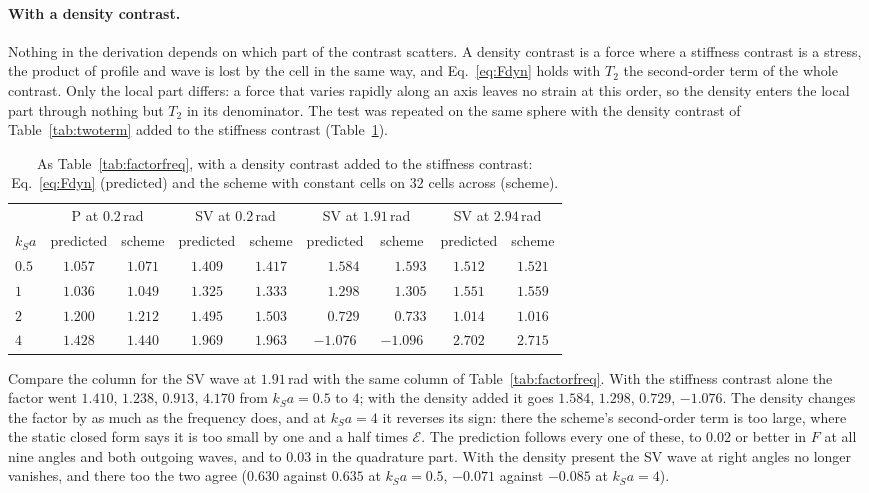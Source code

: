 \documentclass[11pt,a4paper]{article}
\newcommand{\cE}{\mathcal{E}}
\begin{document}
\paragraph{With a density contrast.} Nothing in the derivation depends on which part of the contrast
scatters. A density contrast is a force where a stiffness contrast is a stress, the product of profile
and wave is lost by the cell in the same way, and Eq.~\eqref{eq:Fdyn} holds with $T_2$ the second-order
term of the whole contrast. Only the local part differs: a force that varies rapidly along an axis leaves
no strain at this order, so the density enters the local part through nothing but $T_2$ in its
denominator. The test was repeated on the same sphere with the density contrast of
Table~\ref{tab:twoterm} added to the stiffness contrast (Table~\ref{tab:factorfreqrho}).
\begin{table}[htbp]
\centering
\caption{As Table~\ref{tab:factorfreq}, with a density contrast added to the stiffness contrast:
Eq.~\eqref{eq:Fdyn} (predicted) and the scheme with constant cells on $32$ cells across
(scheme).}\label{tab:factorfreqrho}
\small
\begin{tabular}{@{}lcccccccc@{}}
\toprule
 & \multicolumn{2}{c}{P at $0.2$\,rad} & \multicolumn{2}{c}{SV at $0.2$\,rad} &
   \multicolumn{2}{c}{SV at $1.91$\,rad} & \multicolumn{2}{c}{SV at $2.94$\,rad} \\
$k_Sa$ & predicted & scheme & predicted & scheme & predicted & scheme & predicted & scheme \\
\midrule
$0.5$ & $1.057$ & $1.071$ & $1.409$ & $1.417$ & $\phantom{-}1.584$ & $\phantom{-}1.593$ & $1.512$ & $1.521$ \\
$1$   & $1.036$ & $1.049$ & $1.325$ & $1.333$ & $\phantom{-}1.298$ & $\phantom{-}1.305$ & $1.551$ & $1.559$ \\
$2$   & $1.200$ & $1.212$ & $1.495$ & $1.503$ & $\phantom{-}0.729$ & $\phantom{-}0.733$ & $1.014$ & $1.016$ \\
$4$   & $1.428$ & $1.440$ & $1.969$ & $1.963$ & $-1.076$ & $-1.096$ & $2.702$ & $2.715$ \\
\bottomrule
\end{tabular}
\end{table}
Compare the column for the SV wave at $1.91$\,rad with the same column of Table~\ref{tab:factorfreq}.
With the stiffness contrast alone the factor went $1.410$, $1.238$, $0.913$, $4.170$ from $k_Sa=0.5$ to
$4$; with the density added it goes $1.584$, $1.298$, $0.729$, $-1.076$. The density changes the factor by
as much as the frequency does, and at $k_Sa=4$ it reverses its sign: there the scheme's second-order term
is too large, where the static closed form says it is too small by one and a half times $\cE$. The
prediction follows every one of these, to $0.02$ or better in $F$ at all nine angles and both outgoing
waves, and to $0.03$ in the quadrature part. With the density present the SV wave at right angles no
longer vanishes, and there too the two agree ($0.630$ against $0.635$ at $k_Sa=0.5$, $-0.071$ against
$-0.085$ at $k_Sa=4$).
\end{document}
